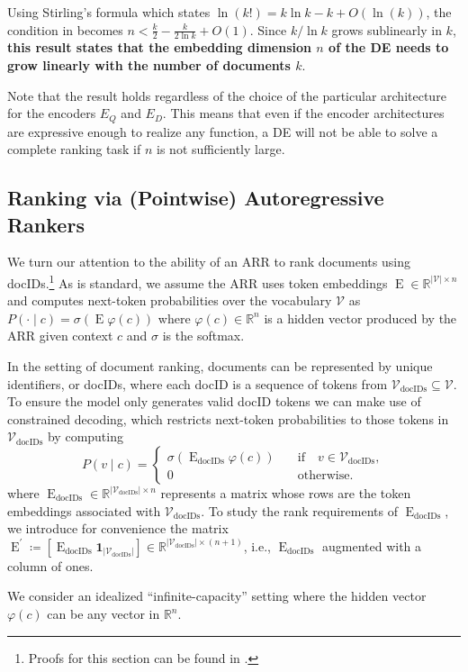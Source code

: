 \documentclass[11pt, a4paper, onecolumn, confidential, copyright, gdm]{google}
\newcommand{\Edocids}{\operatorname{E}_{\text{docIDs}}}
\newcommand{\Eprime}{\operatorname{E}^{\prime}}
\newcommand{\Vdocids}{\mathscr{V}_{\text{docIDs}}}
\begin{document}
Using Stirling's formula which states $\ln(k!) = k \ln k - k + O(\ln(k))$, the condition in  becomes $n < \frac{k}{2} - \frac{k}{2\ln k} + O(1)$. Since $k / \ln k$ grows sublinearly in $k$, \textbf{this result states that the embedding dimension $n$ of the DE needs to grow linearly with the number of documents $k$}.

Note that the result holds regardless of the choice of the particular architecture for the encoders $E_Q$ and $E_D$. 
This means that even if the encoder architectures are expressive enough to realize any function, a DE will not be able to solve a complete ranking task if $n$ is not sufficiently large.


\subsection{Ranking via (Pointwise) Autoregressive Rankers}

We turn our attention to the ability of an ARR to rank documents using docIDs.\footnote{Proofs for this section can be found in .} As is standard, we assume the ARR uses token embeddings $\operatorname{E}\in \mathbb R^{|\mathcal{V}| \times n}$ and computes next-token probabilities over the vocabulary $\mathcal{V}$ as  $P(\cdot \mid c) = \sigma(\operatorname{E} \varphi(c))$ where $\varphi(c) \in \mathbb R^n$ is a hidden vector produced by the ARR given context $c$ and $\sigma$ is the softmax.

In the setting of document ranking, documents can be represented by unique identifiers, or docIDs, where each docID is a sequence of tokens from $\Vdocids \subseteq \mathcal{V}$. To ensure the model only generates valid docID tokens we can make use of constrained decoding, which restricts next-token probabilities to those tokens in $\Vdocids$ by computing
\[
P(v\mid c) = \begin{cases}
\sigma(\Edocids \varphi(c)) \quad & \text{if} \quad v \in \Vdocids,\\
0 \quad & \text{otherwise.}
\end{cases}
\]
where $\Edocids \in \mathbb{R}^{|\Vdocids| \times n}$ represents a matrix whose rows are the token embeddings associated with $\Vdocids$. To study the rank requirements of $\Edocids$, we introduce for convenience the matrix $\Eprime \coloneqq [\Edocids \mathbf{1}_{|\Vdocids|}] \in \mathbb{R}^{|\Vdocids| \times (n+1)}$, i.e., $\Edocids$ augmented with a column of ones.

We consider an idealized ``infinite-capacity'' setting where the hidden vector $\varphi (c)$ can be any vector in $\mathbb R^n$.
\end{document}

